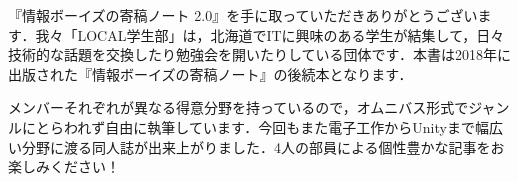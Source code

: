 『情報ボーイズの寄稿ノート 2.0』を手に取っていただきありがとうございます．我々「LOCAL学生部」は，北海道でITに興味のある学生が結集して，日々技術的な話題を交換したり勉強会を開いたりしている団体です．本書は2018年に出版された『情報ボーイズの寄稿ノート』の後続本となります．

メンバーそれぞれが異なる得意分野を持っているので，オムニバス形式でジャンルにとらわれず自由に執筆しています．今回もまた電子工作からUnityまで幅広い分野に渡る同人誌が出来上がりました．4人の部員による個性豊かな記事をお楽しみください！
